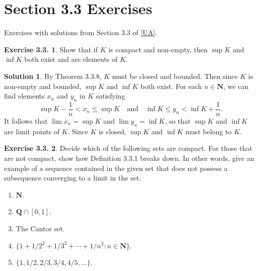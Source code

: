 \documentclass[12pt]{article}
\theoremstyle{definition}
\theoremstyle{exercise}
\newtheorem{exercise}{Exercise 3.3.}
\theoremstyle{solution}
\newtheorem*{solution}{Solution}
\newcommand{\quand}{\quad \text{and} \quad}
\newcommand{\N}{\mathbf{N}}
\newcommand{\Q}{\mathbf{Q}}
\begin{document}
\section{Section 3.3 Exercises}

Exercises with solutions from Section 3.3 of \hyperlink{ua}{[UA]}.

\begin{exercise}
\label{ex:1}
    Show that if \( K \) is compact and non-empty, then \( \sup K \) and \( \inf K \) both exist and are elements of \( K \).
\end{exercise}

\begin{solution}
    By Theorem 3.3.8, \( K \) must be closed and bounded. Then since \( K \) is non-empty and bounded, \( \sup K \) and \( \inf K \) both exist. For each \( n \in \N \), we can find elements \( x_n \) and \( y_n \) in \( K \) satisfying
    \[
        \sup K - \frac{1}{n} < x_n \leq \sup K \quand \inf K \leq y_n < \inf K + \frac{1}{n}.
    \]
    It follows that \( \lim x_n = \sup K \) and \( \lim y_n = \inf K \), so that \( \sup K \) and \( \inf K \) are limit points of \( K \). Since \( K \) is closed, \( \sup K \) and \( \inf K \) must belong to \( K \).
\end{solution}

\begin{exercise}
\label{ex:2}
    Decide which of the following sets are compact. For those that are not compact, show how Definition 3.3.1 breaks down. In other words, give an example of a sequence contained in the given set that does not possess a subsequence converging to a limit in the set.
    \begin{enumerate}
        \item \( \N \).

        \item \( \Q \cap [0, 1] \).

        \item The Cantor set.

        \item \( \{ 1 + 1/2^2 + 1/3^2 + \cdots + 1/n^2 : n \in \N \} \).

        \item \( \{ 1, 1/2, 2/3, 3/4, 4/5, \ldots \} \).
    \end{enumerate}
\end{exercise}
\end{document}
